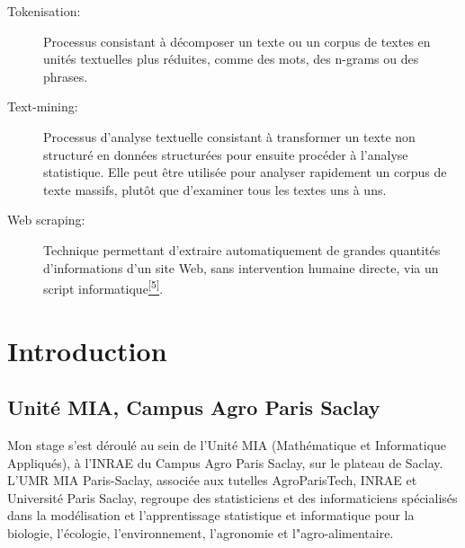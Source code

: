 \documentclass{book}
\begin{document}
\begin{description}
    \item[Tokenisation:] Processus consistant à décomposer un texte ou un corpus
        de textes en unités textuelles plus réduites, comme des mots, des n-grams ou
        des phrases.

    \item[Text-mining:] Processus d'analyse textuelle consistant à transformer
        un texte non structuré en données structurées pour ensuite procéder à
        l'analyse statistique. Elle peut être utilisée pour analyser rapidement un corpus de texte massifs, plutôt que d'examiner tous les textes uns à uns.

    \item[Web scraping:] Technique permettant d'extraire automatiquement de
        grandes quantités d'informations d'un site Web, sans intervention humaine
        directe, via un script informatique\hyperref[site5]{\textsuperscript{[5]}}.
\end{description}

\thispagestyle{fancy}

\newpage
\mbox{} %
\thispagestyle{fancy}
\newpage


\newpage
\fancyhead[LE,RO]{\leftmark}
\chapter{\label{Premier Chapitre}Introduction}

\section{Unité MIA, Campus Agro Paris Saclay}
\noindent
Mon stage s'est déroulé au sein de l'Unité MIA (Mathématique et Informatique
Appliqués), à l'INRAE du Campus Agro Paris Saclay, sur le plateau de Saclay. L'UMR MIA Paris-Saclay, associée aux tutelles AgroParisTech, INRAE et Université Paris Saclay, regroupe des statisticiens et des informaticiens spécialisés dans la modélisation et l'apprentissage statistique et informatique pour la biologie, l'écologie, l'environnement, l'agronomie et l"agro-alimentaire. 
\end{document}
